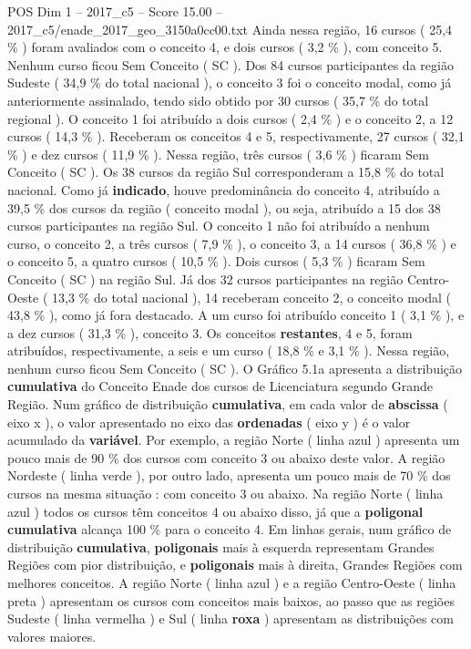 \begin{textsample}{POS Dim 1 – 2017\_c5 – Score 15.00 – 2017\_c5/enade\_2017\_geo\_3150a0cc00.txt}
Ainda nessa região, 16 cursos ( 25,4 \% ) foram avaliados com o conceito 4, e dois cursos ( 3,2 \% ), com conceito 5.
Nenhum curso ficou Sem Conceito ( SC ).
Dos 84 cursos participantes da região Sudeste ( 34,9 \% do total nacional ), o conceito 3 foi o conceito modal, como já anteriormente assinalado, tendo sido obtido por 30 cursos ( 35,7 \% do total regional ).
O conceito 1 foi atribuído a dois cursos ( 2,4 \% ) e o conceito 2, a 12 cursos ( 14,3 \% ).
Receberam os conceitos 4 e 5, respectivamente, 27 cursos ( 32,1 \% ) e dez cursos ( 11,9 \% ).
Nessa região, três cursos ( 3,6 \% ) ficaram Sem Conceito ( SC ).
Os 38 cursos da região Sul corresponderam a 15,8 \% do total nacional.
Como já \textbf{indicado}, houve predominância do conceito 4, atribuído a 39,5 \% dos cursos da região ( conceito modal ), ou seja, atribuído a 15 dos 38 cursos participantes na região Sul.
O conceito 1 não foi atribuído a nenhum curso, o conceito 2, a três cursos ( 7,9 \% ), o conceito 3, a 14 cursos ( 36,8 \% ) e o conceito 5, a quatro cursos ( 10,5 \% ).
Dois cursos ( 5,3 \% ) ficaram Sem Conceito ( SC ) na região Sul.
Já dos 32 cursos participantes na região Centro-Oeste ( 13,3 \% do total nacional ), 14 receberam conceito 2, o conceito modal ( 43,8 \% ), como já fora destacado.
A um curso foi atribuído conceito 1 ( 3,1 \% ), e a dez cursos ( 31,3 \% ), conceito 3.
Os conceitos \textbf{restantes}, 4 e 5, foram atribuídos, respectivamente, a seis e um curso ( 18,8 \% e 3,1 \% ).
Nessa região, nenhum curso ficou Sem Conceito ( SC ).
O Gráfico 5.1a apresenta a distribuição \textbf{cumulativa} do Conceito Enade dos cursos de Licenciatura segundo Grande Região.
Num gráfico de distribuição \textbf{cumulativa}, em cada valor de \textbf{abscissa} ( eixo x ), o valor apresentado no eixo das \textbf{ordenadas} ( eixo y ) é o valor acumulado da \textbf{variável}.
Por exemplo, a região Norte ( linha azul ) apresenta um pouco mais de 90 \% dos cursos com conceito 3 ou abaixo deste valor.
A região Nordeste ( linha verde ), por outro lado, apresenta um pouco mais de 70 \% dos cursos na mesma situação : com conceito 3 ou abaixo.
Na região Norte ( linha azul ) todos os cursos têm conceitos 4 ou abaixo disso, já que a \textbf{poligonal} \textbf{cumulativa} alcança 100 \% para o conceito 4.
Em linhas gerais, num gráfico de distribuição \textbf{cumulativa}, \textbf{poligonais} mais à esquerda representam Grandes Regiões com pior distribuição, e \textbf{poligonais} mais à direita, Grandes Regiões com melhores conceitos.
A região Norte ( linha azul ) e a região Centro-Oeste ( linha preta ) apresentam os cursos com conceitos mais baixos, ao passo que as regiões Sudeste ( linha vermelha ) e Sul ( linha \textbf{roxa} ) apresentam as distribuições com valores maiores.

\end{textsample}
